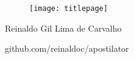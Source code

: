 \thispagestyle{empty}

\begin{center}
  \begin{figure}[H]
    \begin{center}
      \hspace{-1cm}
      \texttt{[image: titlepage]}
  ~\cite{FrontPageIMG}
    \end{center}      
  \end{figure}

  \vskip 2cm

  \hspace{-1cm}
  \begin{minipage}[c]{17cm}
    \begin{center}

{\huge {}\vskip 0.15cm %

{\large Reinaldo Gil Lima de Carvalho} %
}
    \end{center}
  \end{minipage}

  \vskip 14cm

  {\huge github.com/reinaldoc/apostilator} %

\end{center}
